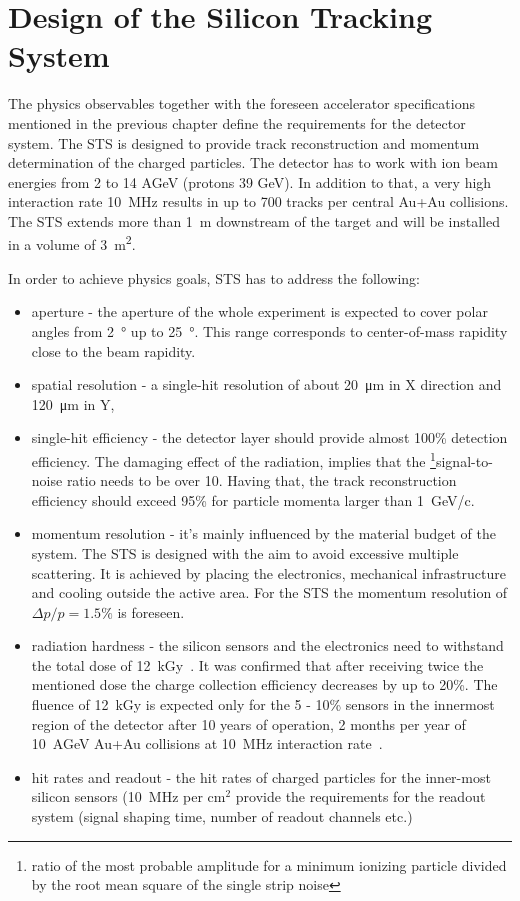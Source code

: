 \section{Design of the Silicon Tracking System}
\label{STS}

The physics observables together with the foreseen accelerator specifications mentioned in the previous chapter define the requirements for the detector system. The \gls{STS} is designed to provide track reconstruction and momentum determination of the charged particles. The detector has to work with ion beam energies from 2 to 14 AGeV (protons 39 GeV). In addition to that, a very high interaction rate 10~MHz results in up to 700 tracks per central Au+Au collisions. The \gls{STS} extends more than \SI{1}{\metre} downstream of the target and will be installed in a volume of \SI{3}{\square\metre}. 

In order to achieve physics goals, \gls{STS} has to address the following:
\begin{itemize}
    \item  aperture - the aperture of the whole experiment is expected to cover polar angles from \SI{2}{\degree} up to \SI{25}{\degree}. This range corresponds to center-of-mass rapidity close to the beam rapidity. 
    \item spatial resolution - a single-hit resolution of about \SI{20}{\micro\metre} in X direction and \SI{120}{\micro\metre} in Y, 
    \item single-hit efficiency - the detector layer should provide almost 100\% detection efficiency. The damaging effect of the radiation, implies that the \footnote{ratio of the most probable amplitude for a minimum ionizing particle divided by the root mean square of the single strip noise}{signal-to-noise} ratio needs to be over 10. Having that, the track reconstruction efficiency should exceed 95\% for particle momenta larger than 1~GeV/c. 
    \item momentum resolution - it's mainly influenced by the material budget of the system. The \gls{STS} is designed with the aim to avoid excessive multiple scattering. It is achieved by placing the electronics, mechanical infrastructure and cooling outside the active area. For the \gls{STS} the momentum resolution of $\Delta p/p = 1.5\%$ is foreseen. 
    \item radiation hardness - the silicon sensors and the electronics need to withstand the total dose of 12~kGy~\cite{Heuser:54798}. It was confirmed that after receiving twice the mentioned dose the charge collection efficiency decreases by up to 20\%. The fluence of 12~kGy is expected only for the 5 - 10\% sensors in the innermost region of the detector after 10 years of operation, 2 months per year of 10~AGeV Au+Au collisions at 10~MHz interaction rate~\cite{Heuser:54798}.
    \item hit rates and readout - the hit rates of charged particles for the inner-most silicon sensors (10~MHz per $\mathrm{cm^{2}}$ provide the requirements for the readout system (signal shaping time, number of readout channels etc.)
\end{itemize}


